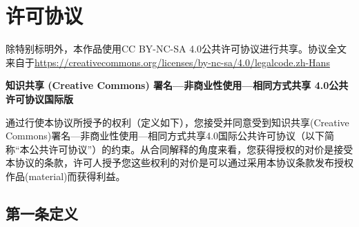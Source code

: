 
\chapter{许可协议}

除特别标明外，本作品使用CC BY-NC-SA 4.0公共许可协议进行共享。协议全文来自于\url{https://creativecommons.org/licenses/by-nc-sa/4.0/legalcode.zh-Hans}

\begin{center}
    \textbf{\Large 知识共享 (Creative Commons) 署名—非商业性使用—相同方式共享 4.0公共许可协议国际版}
\end{center}

通过行使本协议所授予的权利（定义如下），您接受并同意受到知识共享(Creative Commons)署名—非商业性使用—相同方式共享4.0国际公共许可协议（以下简称“本公共许可协议”）的约束。从合同解释的角度来看，您获得授权的对价是接受本协议的条款，许可人授予您这些权利的对价是可以通过采用本协议条款发布授权作品(material)而获得利益。

\section*{第一条\;定义} \label{section:A.1}

